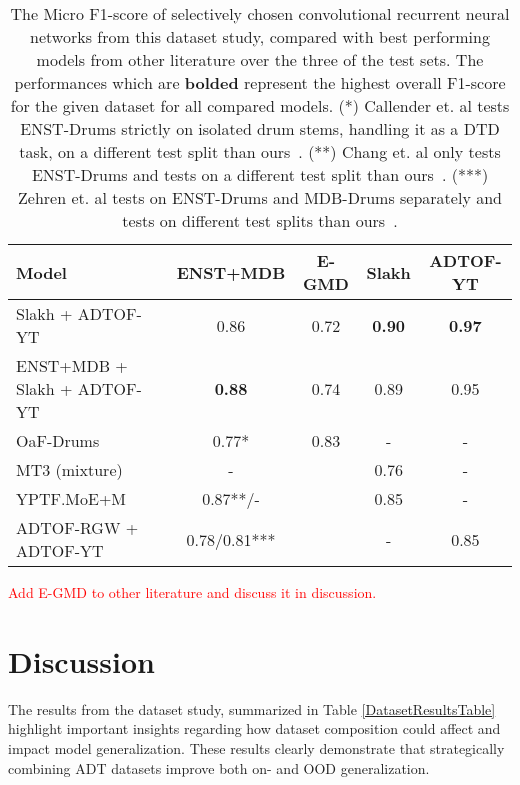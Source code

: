 \begin{table}[H]
    \centering
    \hspace*{-0.6cm}
    \begin{tabular}{l|cccc}
        Model & ENST+MDB & E-GMD & Slakh & ADTOF-YT      \\
        \hline
        Slakh + ADTOF-YT & 0.86	& 0.72 & \textbf{0.90}	& \textbf{0.97} \\
        ENST+MDB + Slakh + ADTOF-YT & \textbf{0.88}	& 0.74 & 0.89	& 0.95 \\
        \hline
        OaF-Drums~\cite{callender2020improvingperceptualqualitydrum} & 0.77* & 0.83 & - & - \\
        \hline
        MT3 (mixture)~\cite{gardner2022mt3multitaskmultitrackmusic} & - &  & 0.76 & - \\
        \hline
        YPTF.MoE+M~\cite{chang2024yourmt3+} & 0.87**/- &  & 0.85 & - \\
        \hline
        ADTOF-RGW + ADTOF-YT~\cite{signals4040042} & 0.78/0.81*** &  & - & 0.85 \\
    \end{tabular}
    \caption{The Micro F1-score of selectively chosen convolutional recurrent neural networks from this dataset study, compared with best performing models from other literature over the three of the test sets. The performances which are \textbf{bolded} represent the highest overall F1-score for the given dataset for all compared models.
    (*) Callender et. al tests ENST-Drums strictly on isolated drum stems, handling it as a \gls{DTD} task, on a different test split than ours~\cite{callender2020improvingperceptualqualitydrum}.
    (**) Chang et. al only tests ENST-Drums and tests on a different test split than ours~\cite{chang2024yourmt3+}.
    (***) Zehren et. al tests on ENST-Drums and MDB-Drums separately and tests on different test splits than ours~\cite{signals4040042}.
    }
    \label{DatasetComparisonTable}
\end{table}

\textcolor{red}{Add E-GMD to other literature and discuss it in discussion.}

\section{Discussion}

The results from the dataset study, summarized in Table \ref{DatasetResultsTable} highlight important insights regarding how dataset composition could affect and impact model generalization. These results clearly demonstrate that strategically combining \gls{ADT} datasets improve both on- and \acrfull{OOD} generalization.

